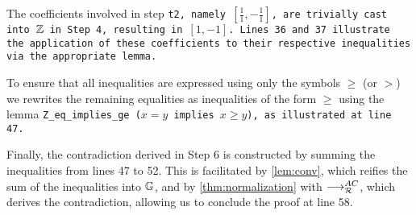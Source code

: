 The coefficients involved in step \tt{t2}, namely $[\frac{1}{1}, -\frac{1}{1}]$, are trivially cast into $\mathbb{Z}$ in Step 4,
resulting in $[1, -1]$. Lines 36 and 37 illustrate the application of these coefficients to their respective inequalities via the appropriate lemma.

To ensure that all inequalities are expressed using only the symbols $\geq$ (or $>$) we rewrites the remaining equalities as inequalities of the form $\geq$ using the lemma \tt{Z\_eq\_implies\_ge} ($x = y$ implies $ x \geq y$),
as illustrated at line 47.

Finally, the contradiction derived in Step 6 is constructed by summing the inequalities from lines 47 to 52.
This is facilitated by \cref{lem:conv}, which reifies the sum of the inequalities into $\mathbb{G}$, and by \cref{thm:normalization} with $\longrightarrow_{\mathcal{R}}^{AC}$,
which derives the contradiction, allowing us to conclude the proof at line 58.

